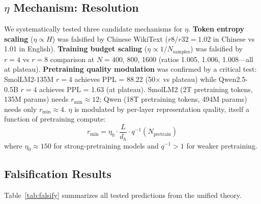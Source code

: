 \documentclass[11pt]{article}
\begin{document}
\subsection{$\eta$ Mechanism: Resolution}

We systematically tested three candidate mechanisms for $\eta$. \textbf{Token entropy scaling} ($\eta \propto H$) was falsified by Chinese WikiText ($r8/r32 = 1.02$ in Chinese vs 1.01 in English). \textbf{Training budget scaling} ($\eta \propto 1/N_{\text{samples}}$) was falsified by $r=4$ vs $r=8$ comparison at $N = 400$, 800, 1600 (ratios 1.005, 1.006, 1.008---all at plateau). \textbf{Pretraining quality modulation} was confirmed by a critical test: SmolLM2-135M $r=4$ achieves PPL = 88.22 (50$\times$ vs plateau) while Qwen2.5-0.5B $r=4$ achieves PPL = 1.63 (at plateau). SmolLM2 (2T pretraining tokens, 135M params) needs $r_{\min} \approx 12$; Qwen (18T pretraining tokens, 494M params) needs only $r_{\min} \approx 4$. $\eta$ is modulated by per-layer representation quality, itself a function of pretraining compute:
\begin{equation}
r_{\min} = \eta_0 \cdot \frac{L}{d_h} \cdot q^{-1}(N_{\text{pretrain}})
\end{equation}
where $\eta_0 \approx 150$ for strong-pretraining models and $q^{-1} > 1$ for weaker pretraining.

\subsection{Falsification Results}

Table~\ref{tab:falsify} summarizes all tested predictions from the unified theory.
\end{document}
